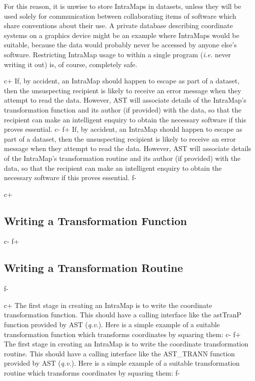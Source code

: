 \documentclass[twoside,11pt]{article}
\newcommand{\xlabel}[1]{}
\begin{document}
For this reason, it is unwise to store IntraMaps in datasets, unless
they will be used solely for communication between collaborating items
of software which share conventions about their use.  A private
database describing coordinate systems on a graphics device might be
an example where IntraMaps would be suitable, because the data would
probably never be accessed by anyone else's software. Restricting
IntraMap usage to within a single program ({\em{i.e.}} never writing
it out) is, of course, completely safe.

c+
If, by accident, an IntraMap should happen to escape as part of a
dataset, then the unsuspecting recipient is likely to receive an error
message when they attempt to read the data. However, AST will
associate details of the IntraMap's transformation function and its
author (if provided) with the data, so that the recipient can make an
intelligent enquiry to obtain the necessary software if this proves
essential.
c-
f+
If, by accident, an IntraMap should happen to escape as part of a
dataset, then the unsuspecting recipient is likely to receive an error
message when they attempt to read the data. However, AST will
associate details of the IntraMap's transformation routine and its
author (if provided) with the data, so that the recipient can make an
intelligent enquiry to obtain the necessary software if this proves
essential.
f-

c+
\subsection{\label{ss:transformationfunctions}Writing a Transformation Function}
c-
f+
\subsection{\label{ss:transformationfunctions}Writing a Transformation Routine}
f-

c+
The first stage in creating an IntraMap is to write the coordinate
transformation function. This should have a calling interface like the
astTranP function provided by AST ({\em{q.v.}}). Here is a simple
example of a suitable transformation function which transforms
coordinates by squaring them:
c-
f+
The first stage in creating an IntraMap is to write the coordinate
transformation routine. This should have a calling interface like the
AST\_TRANN function provided by AST ({\em{q.v.}}). Here is a simple
example of a suitable transformation routine which transforms
coordinates by squaring them:
f-
\xlabel{SqrTran}
\end{document}
